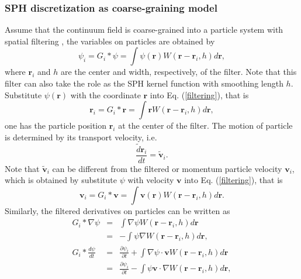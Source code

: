 \documentclass[12pt, a4paper,onecolumn]{article}
\begin{document}
\subsubsection{SPH discretization as coarse-graining model}
Assume that the continuum field is coarse-grained into a particle system 
with spatial filtering \cite{hu2012sph}, the variables on particles are obtained by
%
\begin{equation}
\psi_i  =  G_i * \psi  =  \int \psi(\mathbf{r}) W(\mathbf{r} - \mathbf{r}_i, h)d\mathbf{r}, 
\label{filtering}
\end{equation}
%
where $\mathbf{r}_{i}$ and $h$ are the center and width, respectively, of the filter.
Note that this filter can also take the role as the SPH kernel function with smoothing length $h$. 
Substitute $\psi(\mathbf{r})$ with the coordinate $\mathbf{r}$ into Eq. (\ref{filtering}),
that is
%
\begin{equation}\label{filtered-particle-position}
\mathbf{r}_i  =  G_i * \mathbf{r}  =  \int \mathbf{r} W(\mathbf{r} - \mathbf{r}_i, h)d\mathbf{r}, 
\end{equation}
%
one has the particle position $\mathbf{r}_i$ at the center of the filter.
The motion of particle is determined by its transport velocity, i.e.
%
\begin{equation}\label{particle-trajectory}
\frac{\widetilde{d} \mathbf{r}_i} {dt} =  \widetilde{\mathbf{v}}_i.
\end{equation}
%
Note that $\widetilde{\mathbf{v}}_i$ can be different from the filtered or momentum particle velocity $\mathbf{v}_i$,
which is obtained by substitute $\psi$ with velocity $\mathbf{v}$ into Eq. (\ref{filtering}), 
that is
%
\begin{equation}\label{momentum-particle-velocity}
\mathbf{v}_i  =  G_i * \mathbf{v}  =  \int \mathbf{v}(\mathbf{r}) W(\mathbf{r} - \mathbf{r}_i, h)d\mathbf{r}. 
\end{equation}
%
Similarly, the filtered derivatives on particles can be written as
%
\begin{eqnarray}
G_i * \nabla \psi & = & \int \nabla\psi W(\mathbf{r} - \mathbf{r}_i, h)d\mathbf{r} \nonumber \\
& = & - \int \psi \nabla W(\mathbf{r} - \mathbf{r}_i, h)d\mathbf{r}, \label{derivative} \\
G_i * \frac{d \psi}{dt} & = & \frac{\partial \psi_i}{\partial t}  + \int \nabla\psi\cdot \mathbf{v} W(\mathbf{r} - \mathbf{r}_i, h)d\mathbf{r} \nonumber \\
& = & \frac{\partial \psi_i}{\partial t} - \int \psi \mathbf{v}\cdot \nabla W(\mathbf{r} - \mathbf{r}_i, h)d\mathbf{r}, \label{full-derivative} 
\end{eqnarray}
\end{document}
